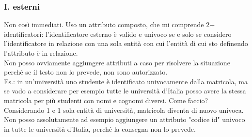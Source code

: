 \subsubsection{I. esterni}
Non così immediati. Uso un attributo composto, che mi comprende 2+ identificatori: l'identificatore esterno è valido e univoco se e solo se considero l'identificatore in relazione con una sola entità con cui l'entità di cui sto definendo l'attributo è in relazione.
\\Non posso ovviamente aggiungere attributi a caso per risolvere la situazione perché se il testo non lo prevede, non sono autorizzato.
\\Es.: in un'università uno studente è identificato univocamente dalla matricola, ma se vado a considerare per esempio tutte le università d'Italia posso avere la stessa matricola per più studenti con nomi e cognomi diversi. Come faccio? Considerando 1 e 1 sola entità di università, matricola diventa di nuovo univoca. Non posso assolutamente ad esempio aggiungere un attributo "codice id" univoco in tutte le università d'Italia, perché la consegna non lo prevede.